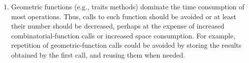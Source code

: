\begin{enumerate}
\item
Geometric functions (e.g., traits methods) dominate the time
consumption of most operations. Thus, calls to such function should be
avoided or at least their number should be decreased, perhaps at the
expense of increased combinatorial-function calls or increased space
consumption. For example, repetition of geometric-function calls could
be avoided by storing the results obtained by the first call, and
reusing them when needed.
\end{enumerate}
